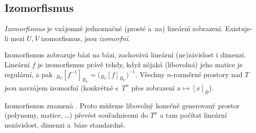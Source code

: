 \documentclass[11pt,a4paper]{article}
\begin{document}

\subsection{Izomorfismus}

\begin{definice}[Izomorfismus]
\emph{Izomorfismus} je vzájemně jednoznačné (prosté a~na) lineární zobrazení. Existuje-li mezi $U,V$ izomorfismus, jsou \emph{izomorfní}.
\end{definice}

\begin{veta}
Izomorfismus zobrazuje bázi na bázi, zachovává lineární (ne)závislost i dimenzi. Lineární $f$ je izomorfismus právě tehdy, když nějaká (libovolná) jeho matice je regulární, a pak $\,{}_{B_U}[f^{-1}]_{B_V}=\bigl({}_{B_V}[f]_{B_U}\bigr)^{-1}$. Všechny $n$-rozměrné prostory nad $T$ jsou navzájem izomorfní (konkrétně s~$T^n$ přes zobrazení $x\mapsto[x]_B$).
\end{veta}

\begin{intuice}
Izomorfismus znamená . Proto můžeme libovolný konečně generovaný prostor (polynomy, matice, \dots) převést souřadnicemi do $T^n$ a tam počítat lineární nezávislost, dimenzi a~báze standardně.
\end{intuice}
\end{document}
